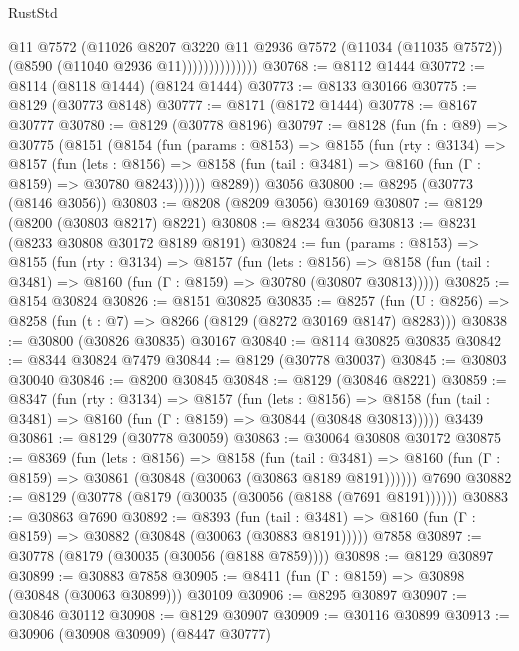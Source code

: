 \begin{lexlean}{RustStd}
\begin{coremodule}
                          @11
                          @7572
                          (@11026
                            @8207
                            @3220
                            @11
                            @2936
                            @7572
                            (@11034 (@11035 @7572))
                            (@8590 (@11040 @2936 @11))))))))))))))
@30768 := @8112 @1444
@30772 := @8114 (@8118 @1444) (@8124 @1444)
@30773 := @8133 @30166
@30775 := @8129 (@30773 @8148)
@30777 := @8171 (@8172 @1444)
@30778 := @8167 @30777
@30780 := @8129 (@30778 @8196)
@30797 := @8128
    (fun (fn : @89) =>
    @30775
      (@8151
        (@8154
          (fun (params : @8153) =>
          @8155
            (fun (rty : @3134) =>
            @8157
              (fun (lets : @8156) =>
              @8158 (fun (tail : @3481) => @8160 (fun (Γ : @8159) => @30780 @8243))))))
        @8289))
    @3056
@30800 := @8295 (@30773 (@8146 @3056))
@30803 := @8208 (@8209 @3056) @30169
@30807 := @8129 (@8200 (@30803 @8217) @8221)
@30808 := @8234 @3056
@30813 := @8231 (@8233 @30808 @30172 @8189 @8191)
@30824 := fun (params : @8153) =>
  @8155
    (fun (rty : @3134) =>
    @8157
      (fun (lets : @8156) =>
      @8158 (fun (tail : @3481) => @8160 (fun (Γ : @8159) => @30780 (@30807 @30813)))))
@30825 := @8154 @30824
@30826 := @8151 @30825
@30835 := @8257
    (fun (U : @8256) => @8258 (fun (t : @7) => @8266 (@8129 (@8272 @30169 @8147) @8283)))
@30838 := @30800 (@30826 @30835) @30167
@30840 := @8114 @30825 @30835
@30842 := @8344 @30824 @7479
@30844 := @8129 (@30778 @30037)
@30845 := @30803 @30040
@30846 := @8200 @30845
@30848 := @8129 (@30846 @8221)
@30859 := @8347
    (fun (rty : @3134) =>
    @8157
      (fun (lets : @8156) =>
      @8158 (fun (tail : @3481) => @8160 (fun (Γ : @8159) => @30844 (@30848 @30813)))))
    @3439
@30861 := @8129 (@30778 @30059)
@30863 := @30064 @30808 @30172
@30875 := @8369
    (fun (lets : @8156) =>
    @8158
      (fun (tail : @3481) =>
      @8160 (fun (Γ : @8159) => @30861 (@30848 (@30063 (@30863 @8189 @8191))))))
    @7690
@30882 := @8129 (@30778 (@8179 (@30035 (@30056 (@8188 (@7691 @8191))))))
@30883 := @30863 @7690
@30892 := @8393
    (fun (tail : @3481) => @8160 (fun (Γ : @8159) => @30882 (@30848 (@30063 (@30883 @8191)))))
    @7858
@30897 := @30778 (@8179 (@30035 (@30056 (@8188 @7859))))
@30898 := @8129 @30897
@30899 := @30883 @7858
@30905 := @8411 (fun (Γ : @8159) => @30898 (@30848 (@30063 @30899))) @30109
@30906 := @8295 @30897
@30907 := @30846 @30112
@30908 := @8129 @30907
@30909 := @30116 @30899
@30913 := @30906 (@30908 @30909) (@8447 @30777)

\end{coremodule}
\end{lexlean}
